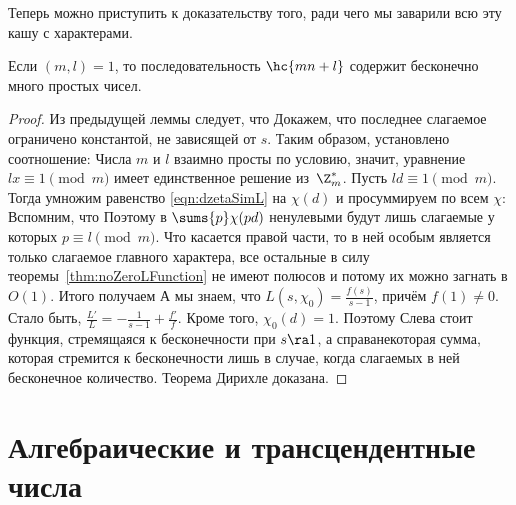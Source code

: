 \documentclass[a4paper]{article}
\def\nequiv{\not\equiv}
\begin{document}
Теперь можно приступить к доказательству того, ради чего мы заварили всю эту кашу с характерами.

\begin{theorem}[Дирихле]
Если $(m,l)=1$, то последовательность $\hc{mn+l}$ содержит бесконечно много простых чисел.
\end{theorem}
\begin{proof}
Из предыдущей леммы следует, что
Докажем, что последнее слагаемое ограничено константой, не зависящей от $s$.
Таким образом, установлено соотношение:
Числа $m$ и $l$ взаимно просты по условию, значит, уравнение $lx\equiv1\pmod{m}$ имеет единственное
решение из~$\Z_m^*$. Пусть $ld\equiv1\pmod{m}$. Тогда умножим равенство \eqref{eqn:dzetaSimL} на $\chi(d)$ и
просуммируем по всем $\chi$:
Вспомним, что
\eqn{\sums{\chi}\chi(n)=\case{\ph(m),&n\equiv1\pmod{m},\\0,&n\nequiv1\pmod{m}.}}
Поэтому в $\sums{p}\chi(pd)$ ненулевыми будут лишь слагаемые у которых $p\equiv l\pmod{m}$.
Что касается правой части, то в ней особым является только слагаемое главного характера,
все остальные в силу теоремы~\ref{thm:noZeroLFunction} не имеют полюсов и потому их можно загнать в $O(1)$.
Итого получаем
А мы знаем, что $L(s,\chi_0)=\frac{f(s)}{s-1}$, причём $f(1) \neq 0$.
Стало быть, $\frac{L'}{L}=-\frac1{s-1}+\frac{f'}{f}$. Кроме того,
$\chi_0(d)=1$. Поэтому
Слева стоит функция, стремящаяся к бесконечности при $s\ra1$, а справа\т  некоторая сумма, которая стремится
к бесконечности лишь в случае, когда слагаемых в ней бесконечное количество. Теорема Дирихле доказана.
\end{proof}

\section{Алгебраические и трансцендентные числа}
\end{document}
